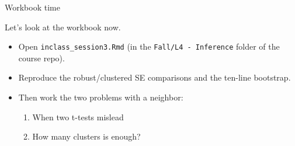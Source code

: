 \documentclass[aspectratio=169,11pt]{beamer}
\begin{document}
\begin{frame}{Workbook time}
\begin{center}
{\LARGE \alert{Let's look at the workbook now.}}
\end{center}
\bigskip
\begin{itemize}
	\item Open \texttt{inclass\_session3.Rmd} (in the \texttt{Fall/L4 - Inference} folder of the course repo).
	\item Reproduce the robust/clustered SE comparisons and the ten-line bootstrap.
	\item Then work the two problems with a neighbor:
	\begin{enumerate}
		\item When two t-tests mislead
		\item How many clusters is enough?
	\end{enumerate}
\end{itemize}
\end{frame}
\end{document}

